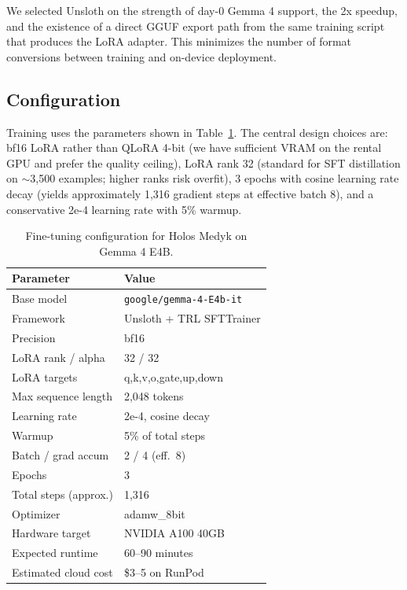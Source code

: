 \documentclass{article}
\theoremstyle{plain}
\theoremstyle{definition}
\theoremstyle{remark}
\begin{document}
We selected Unsloth on the strength of day-0 Gemma 4 support, the 2x speedup, and the existence of a direct GGUF export path from the same training script that produces the LoRA adapter. This minimizes the number of format conversions between training and on-device deployment.

\subsection{Configuration}

Training uses the parameters shown in Table~\ref{tab:training-config}. The central design choices are: bf16 LoRA rather than QLoRA 4-bit (we have sufficient VRAM on the rental GPU and prefer the quality ceiling), LoRA rank 32 (standard for SFT distillation on $\sim$3{,}500 examples; higher ranks risk overfit), 3 epochs with cosine learning rate decay (yields approximately 1{,}316 gradient steps at effective batch 8), and a conservative 2e-4 learning rate with 5\% warmup.

\begin{table}[h]
\centering
\small
\caption{Fine-tuning configuration for Holos Medyk on Gemma 4 E4B.}
\label{tab:training-config}
\begin{tabular}{ll}
\toprule
\textbf{Parameter} & \textbf{Value} \\
\midrule
Base model & \texttt{google/gemma-4-E4b-it} \\
Framework & Unsloth + TRL SFTTrainer \\
Precision & bf16 \\
LoRA rank / alpha & 32 / 32 \\
LoRA targets & q,k,v,o,gate,up,down \\
Max sequence length & 2{,}048 tokens \\
Learning rate & 2e-4, cosine decay \\
Warmup & 5\% of total steps \\
Batch / grad accum & 2 / 4 (eff.\ 8) \\
Epochs & 3 \\
Total steps (approx.) & 1{,}316 \\
Optimizer & adamw\_8bit \\
Hardware target & NVIDIA A100 40GB \\
Expected runtime & 60--90 minutes \\
Estimated cloud cost & \$3--5 on RunPod \\
\bottomrule
\end{tabular}
\end{table}
\end{document}
